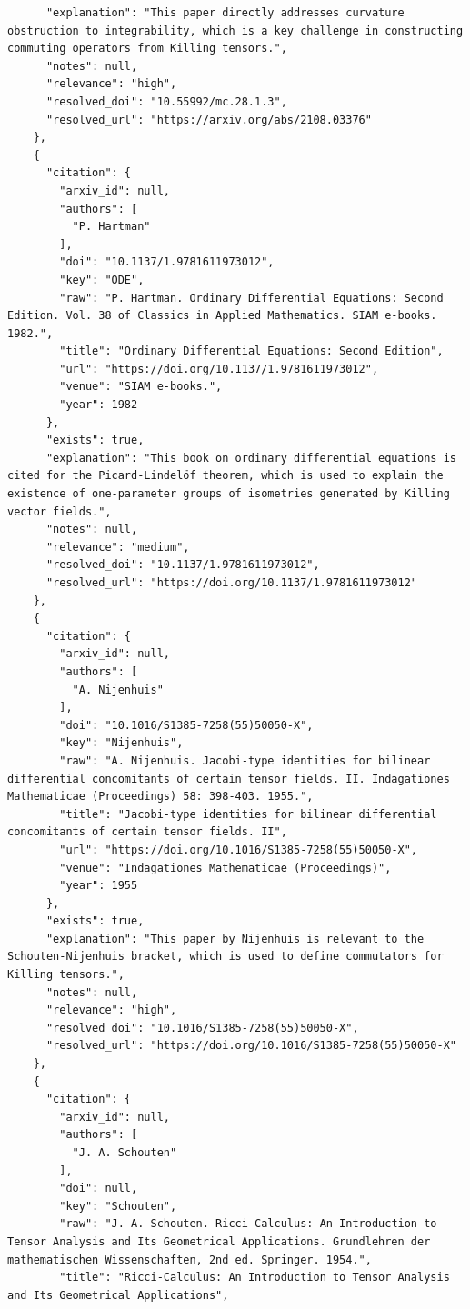 \documentclass[11pt]{article}
\begin{document}
\begin{verbatim}
      "explanation": "This paper directly addresses curvature obstruction to integrability, which is a key challenge in constructing commuting operators from Killing tensors.",
      "notes": null,
      "relevance": "high",
      "resolved_doi": "10.55992/mc.28.1.3",
      "resolved_url": "https://arxiv.org/abs/2108.03376"
    },
    {
      "citation": {
        "arxiv_id": null,
        "authors": [
          "P. Hartman"
        ],
        "doi": "10.1137/1.9781611973012",
        "key": "ODE",
        "raw": "P. Hartman. Ordinary Differential Equations: Second Edition. Vol. 38 of Classics in Applied Mathematics. SIAM e-books. 1982.",
        "title": "Ordinary Differential Equations: Second Edition",
        "url": "https://doi.org/10.1137/1.9781611973012",
        "venue": "SIAM e-books.",
        "year": 1982
      },
      "exists": true,
      "explanation": "This book on ordinary differential equations is cited for the Picard-Lindelöf theorem, which is used to explain the existence of one-parameter groups of isometries generated by Killing vector fields.",
      "notes": null,
      "relevance": "medium",
      "resolved_doi": "10.1137/1.9781611973012",
      "resolved_url": "https://doi.org/10.1137/1.9781611973012"
    },
    {
      "citation": {
        "arxiv_id": null,
        "authors": [
          "A. Nijenhuis"
        ],
        "doi": "10.1016/S1385-7258(55)50050-X",
        "key": "Nijenhuis",
        "raw": "A. Nijenhuis. Jacobi-type identities for bilinear differential concomitants of certain tensor fields. II. Indagationes Mathematicae (Proceedings) 58: 398-403. 1955.",
        "title": "Jacobi-type identities for bilinear differential concomitants of certain tensor fields. II",
        "url": "https://doi.org/10.1016/S1385-7258(55)50050-X",
        "venue": "Indagationes Mathematicae (Proceedings)",
        "year": 1955
      },
      "exists": true,
      "explanation": "This paper by Nijenhuis is relevant to the Schouten-Nijenhuis bracket, which is used to define commutators for Killing tensors.",
      "notes": null,
      "relevance": "high",
      "resolved_doi": "10.1016/S1385-7258(55)50050-X",
      "resolved_url": "https://doi.org/10.1016/S1385-7258(55)50050-X"
    },
    {
      "citation": {
        "arxiv_id": null,
        "authors": [
          "J. A. Schouten"
        ],
        "doi": null,
        "key": "Schouten",
        "raw": "J. A. Schouten. Ricci-Calculus: An Introduction to Tensor Analysis and Its Geometrical Applications. Grundlehren der mathematischen Wissenschaften, 2nd ed. Springer. 1954.",
        "title": "Ricci-Calculus: An Introduction to Tensor Analysis and Its Geometrical Applications",

\end{verbatim}
\end{document}
